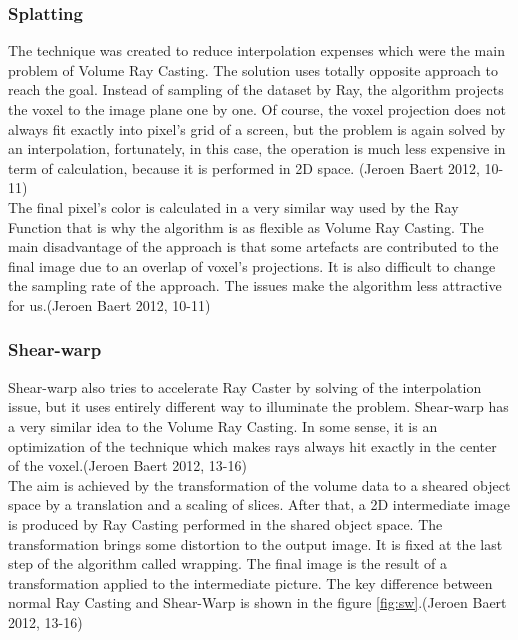 \documentclass[twoside, english, 11pt]{report}
\begin{document}
\subsubsection{Splatting}

The technique was created to reduce interpolation expenses which were the main problem of Volume Ray Casting. The solution uses totally opposite approach to reach the goal. Instead of sampling of the dataset by Ray, the algorithm projects the voxel to the image plane one by one. Of course, the voxel projection does not always fit exactly into pixel's grid of a screen, but the problem is again solved by an interpolation, fortunately, in this case, the operation is much less expensive in term of calculation, because it is performed in 2D space. (Jeroen Baert 2012, 10-11)\\

The final pixel's color is calculated in a very similar way used by the Ray Function that is why the algorithm is as flexible as Volume Ray Casting. The main disadvantage of the approach is that some artefacts are contributed to the final image due to an overlap of voxel's projections. It is also difficult to change the sampling rate of the approach. The issues make the algorithm less attractive for us.(Jeroen Baert 2012, 10-11)\\

\subsubsection{Shear-warp}

Shear-warp also tries to accelerate Ray Caster by solving of the interpolation issue, but it uses entirely different way to illuminate the problem. Shear-warp has a very similar idea to the Volume Ray Casting. In some sense, it is an optimization of the technique which makes rays always hit exactly in the center of the voxel.(Jeroen Baert 2012, 13-16)\\

The aim is achieved by the transformation of the volume data to a sheared object space by a translation and a scaling of slices. After that, a 2D intermediate image is produced by Ray Casting performed in the shared object space. The transformation brings some distortion to the output image. It is fixed at the last step of the algorithm called wrapping. The final image is the result of a transformation applied to the intermediate picture. The key difference between normal Ray Casting and Shear-Warp is shown in the figure \ref{fig:sw}.(Jeroen Baert 2012, 13-16)\\
\end{document}
